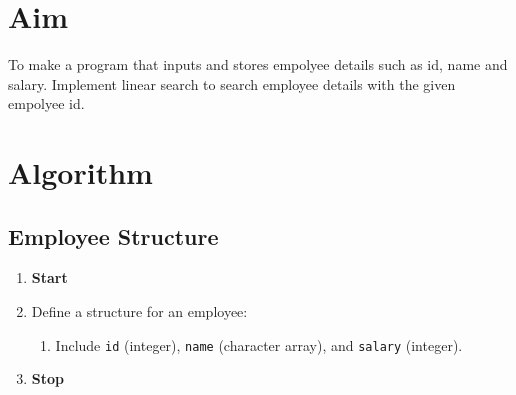 
\section{Aim}
To make a program that inputs and stores empolyee details such as id, name and salary. Implement linear search to search employee details with the given empolyee id.

\section{Algorithm}
 {\selectfont

  \subsection{Employee Structure}
  \begin{enumerate}[label=\arabic*:,left=0pt]
    \item \textbf{Start}
    \item Define a structure for an employee:
          \begin{enumerate}[label=2.\arabic*.]
            \item Include \texttt{id} (integer), \texttt{name} (character array), and \texttt{salary} (integer).
          \end{enumerate}
    \item \textbf{Stop}
  \end{enumerate}

}
